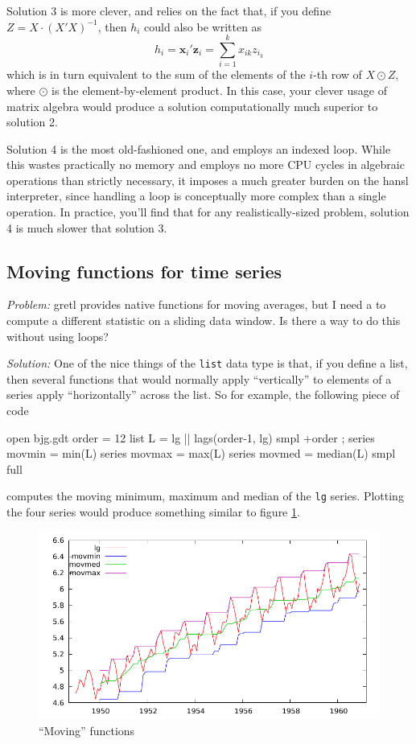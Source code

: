Solution 3 is more clever, and relies on the fact that, if you
define $Z = X\cdot(X'X)^{-1}$, then $h_i$ could also
be written as
\[
 h_i = \mathbf{x}_i' \mathbf{z}_i = \sum_{i=1}^k x_{ik} z_{i_k}
\]
which is in turn equivalent to the sum of the elements of the $i$-th
row of $X \odot Z$, where $\odot$ is the element-by-element
product. In this case, your clever usage of matrix algebra would
produce a solution computationally much superior to solution 2.

Solution 4 is the most old-fashioned one, and employs an indexed
loop. While this wastes practically no memory and employs no more CPU
cycles in algebraic operations than strictly necessary, it imposes a
much greater burden on the hansl interpreter, since handling a loop is
conceptually more complex than a single operation. In practice, you'll
find that for any realistically-sized problem, solution 4 is much
slower that solution 3.

\subsection{Moving functions for time series}
\label{sec:movfun}

\emph{Problem:} gretl provides native functions for moving
averages, but I need a to compute a different statistic on a sliding
data window. Is there a way to do this without using loops?

\emph{Solution:} One of the nice things of the \texttt{list} data type
is that, if you define a list, then several functions that would
normally apply ``vertically'' to elements of a series apply
``horizontally'' across the list. So for example, the following piece
of code
\begin{code}
open bjg.gdt
order = 12
list L = lg || lags(order-1, lg)
smpl +order ;
series movmin = min(L)
series movmax = max(L)
series movmed = median(L)
smpl full
\end{code}
computes the moving minimum, maximum and median of the \texttt{lg}
series. Plotting the four series would produce something similar to
figure \ref{fig:movfun}.

\begin{figure}[hbtp]
  \centering
  \includegraphics{figures/movfun}
  \caption{``Moving'' functions}
  \label{fig:movfun}
\end{figure}

